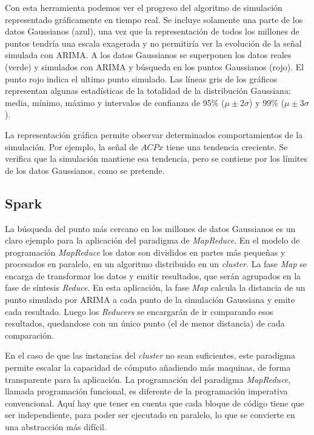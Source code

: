 \documentclass[11pt,spanish,listoffigures,listoftables]{tfgetsinf}
\begin{document}
        Con esta herramienta podemos ver el progreso del algoritmo de simulación representado gráficamente en tiempo real. Se incluye solamente una parte de los datos Gaussianos (azul), una vez que la representación de todos los millones de puntos tendría una escala exagerada y no permitiría ver la evolución de la señal simulada con ARIMA. A los datos Gaussianos se superponen los datos reales (verde) y simulados con ARIMA y búsqueda en los puntos Gaussianos (rojo). El punto rojo indica el ultimo punto simulado. Las líneas gris de los gráficos representan algunas estadísticas de la totalidad de la distribución Gaussiana: media, mínimo, máximo y intervalos de confianza de 95\% (\(\mu \pm 2\sigma\)) y 99\% (\(\mu \pm 3\sigma\)).
        
        La representación gráfica permite observar determinados comportamientos de la simulación. Por ejemplo, la señal de \(ACPx\) tiene una tendencia creciente. Se verifica que la simulación mantiene esa tendencia, pero se contiene por los límites de los datos Gaussianos, como se pretende.
        
            
        \subsection{Spark}
        La búsqueda del punto más cercano en los millones de datos Gaussianos es un claro ejemplo para la aplicación del paradigma de {\em MapReduce}. En el modelo de programación {\em MapReduce} los datos son divididos en partes más pequeñas y procesados en paralelo, en un algoritmo distribuido en un {\em cluster}. La fase {\em Map} se encarga de transformar los datos y emitir resultados, que serán agrupados en la fase de síntesis {\em Reduce}. En esta aplicación, la fase {\em Map} calcula la distancia de un punto simulado por ARIMA a cada punto de la simulación Gaussiana y emite cada resultado. Luego los {\em Reducers} se encargarán de ir comparando esos resultados, quedandose con un único punto (el de menor distancia) de cada comparación.
        
        En el caso de que las instancias del {\em cluster} no sean suficientes, este paradigma permite escalar la capacidad de cómputo añadiendo más maquinas, de forma transparente para la aplicación. La programación del paradigma {\em MapReduce}, llamada programación funcional, es diferente de la programación imperativa convencional. Aquí hay que tener en cuenta que cada bloque de código tiene que ser independiente, para poder ser ejecutado en paralelo, lo que se convierte en una abstracción más difícil.
        
\end{document}
